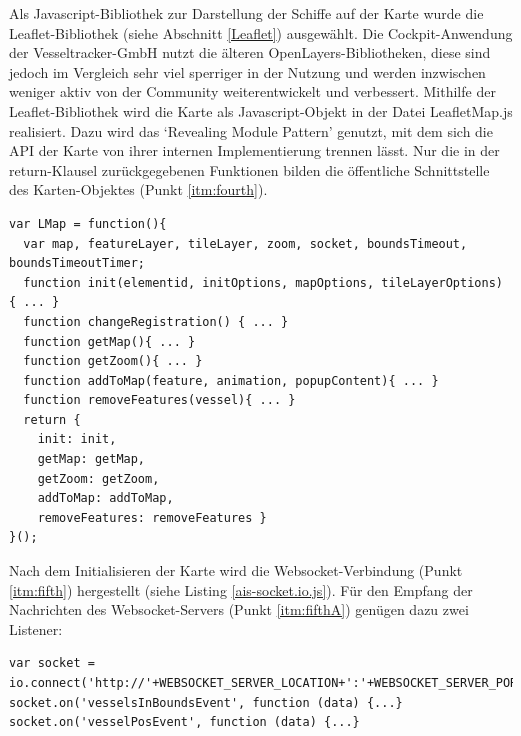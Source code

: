 Als Javascript-Bibliothek zur Darstellung der Schiffe auf der Karte wurde die Leaflet-Bibliothek (siehe Abschnitt \ref{Leaflet}) ausgewählt. Die Cockpit-Anwendung der Vesseltracker-GmbH nutzt die älteren OpenLayers-Bibliotheken, diese sind jedoch im Vergleich sehr viel sperriger in der Nutzung und werden inzwischen weniger aktiv von der Community weiterentwickelt und verbessert.
Mithilfe der Leaflet-Bibliothek wird die Karte als Javascript-Objekt in der Datei LeafletMap.js realisiert. Dazu wird das ‘Revealing Module Pattern’ genutzt, mit dem sich die API der Karte von ihrer internen Implementierung trennen lässt. Nur die in der return-Klausel zurückgegebenen Funktionen bilden die öffentliche Schnittstelle des Karten-Objektes (Punkt \ref{itm:fourth}).

\begin{lstlisting}[caption= ‘Revealing Module Pattern’ in LeafletMap.js, label=LeafletMap.js]
var LMap = function(){
  var map, featureLayer, tileLayer, zoom, socket, boundsTimeout, boundsTimeoutTimer;
  function init(elementid, initOptions, mapOptions, tileLayerOptions) { ... }
  function changeRegistration() { ... } 
  function getMap(){ ... }
  function getZoom(){ ... }
  function addToMap(feature, animation, popupContent){ ... } 
  function removeFeatures(vessel){ ... }
  return {
    init: init,
    getMap: getMap,
    getZoom: getZoom,
    addToMap: addToMap,
    removeFeatures: removeFeatures }
}();
\end{lstlisting}
Nach dem Initialisieren der Karte wird die Websocket-Verbindung (Punkt \ref{itm:fifth}) hergestellt (siehe Listing \ref{ais-socket.io.js}). Für den Empfang der Nachrichten des Websocket-Servers (Punkt \ref{itm:fifthA}) genügen dazu zwei Listener: 
\begin{lstlisting}[caption=Client-Seite der socket.io-Websocket-Verbindung in ais-socket.io.js,  label=ais-socket.io.js]
 var socket = io.connect('http://'+WEBSOCKET_SERVER_LOCATION+':'+WEBSOCKET_SERVER_PORT);
socket.on('vesselsInBoundsEvent', function (data) {...}
socket.on('vesselPosEvent', function (data) {...}
\end{lstlisting}

